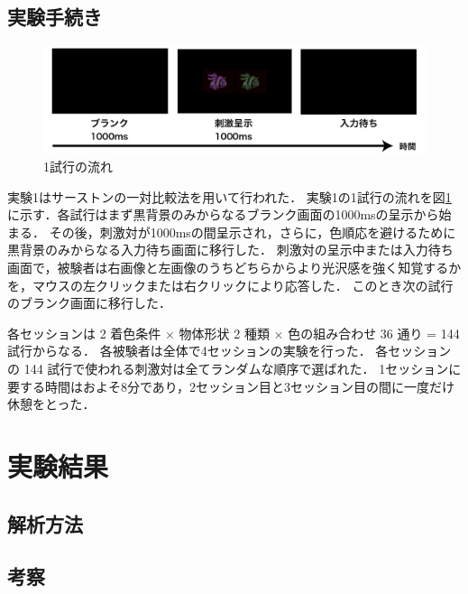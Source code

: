     \subsection{実験手続き}

        \begin{figure}[h]
            \centering
            \includegraphics[width=14.0cm]{./img/ex1_procedure.png}
            \caption{1試行の流れ}
            \label{ex1_procedure}
        \end{figure}

        実験1はサーストンの一対比較法を用いて行われた．
        実験1の1試行の流れを図\ref{ex1_procedure}に示す．各試行はまず黒背景のみからなるブランク画面の1000msの呈示から始まる．
        その後，刺激対が1000msの間呈示され，さらに，色順応を避けるために黒背景のみからなる入力待ち画面に移行した．
        刺激対の呈示中または入力待ち画面で，被験者は右画像と左画像のうちどちらからより光沢感を強く知覚するかを，マウスの左クリックまたは右クリックにより応答した．
        このとき次の試行のブランク画面に移行した．

        各セッションは 2 着色条件 $\times$ 物体形状 2 種類 $\times$ 色の組み合わせ 36 通り = 144 試行からなる．
        各被験者は全体で4セッションの実験を行った．
        各セッションの 144 試行で使われる刺激対は全てランダムな順序で選ばれた．
        1セッションに要する時間はおよそ8分であり，2セッション目と3セッション目の間に一度だけ休憩をとった．



\section{実験結果}
    \subsection{解析方法}

    \subsection{考察}
        
